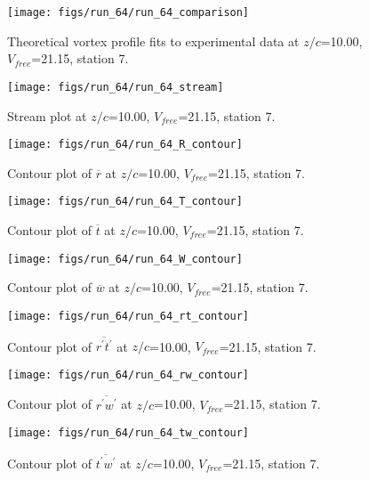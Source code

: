 \begin{figure}[H]
\centering
\texttt{[image: figs/run\_64/run\_64\_comparison]}
\caption{Theoretical vortex profile fits to experimental data at $z/c$=10.00, $V_{free}$=21.15, station 7.}
\label{fig:run_64_comparison}
\end{figure}


\begin{figure}[H]
\centering
\texttt{[image: figs/run\_64/run\_64\_stream]}
\caption{Stream plot at $z/c$=10.00, $V_{free}$=21.15, station 7.}
\label{fig:run_64_stream}
\end{figure}


\begin{figure}[H]
\centering
\texttt{[image: figs/run\_64/run\_64\_R\_contour]}
\caption{Contour plot of $\overline{r}$ at $z/c$=10.00, $V_{free}$=21.15, station 7.}
\label{fig:run_64_R_contour}
\end{figure}


\begin{figure}[H]
\centering
\texttt{[image: figs/run\_64/run\_64\_T\_contour]}
\caption{Contour plot of $\overline{t}$ at $z/c$=10.00, $V_{free}$=21.15, station 7.}
\label{fig:run_64_T_contour}
\end{figure}


\begin{figure}[H]
\centering
\texttt{[image: figs/run\_64/run\_64\_W\_contour]}
\caption{Contour plot of $\overline{w}$ at $z/c$=10.00, $V_{free}$=21.15, station 7.}
\label{fig:run_64_W_contour}
\end{figure}


\begin{figure}[H]
\centering
\texttt{[image: figs/run\_64/run\_64\_rt\_contour]}
\caption{Contour plot of $\overline{r^\prime t^\prime}$ at $z/c$=10.00, $V_{free}$=21.15, station 7.}
\label{fig:run_64_rt_contour}
\end{figure}


\begin{figure}[H]
\centering
\texttt{[image: figs/run\_64/run\_64\_rw\_contour]}
\caption{Contour plot of $\overline{r^\prime w^\prime}$ at $z/c$=10.00, $V_{free}$=21.15, station 7.}
\label{fig:run_64_rw_contour}
\end{figure}


\begin{figure}[H]
\centering
\texttt{[image: figs/run\_64/run\_64\_tw\_contour]}
\caption{Contour plot of $\overline{t^\prime w^\prime}$ at $z/c$=10.00, $V_{free}$=21.15, station 7.}
\label{fig:run_64_tw_contour}
\end{figure}


